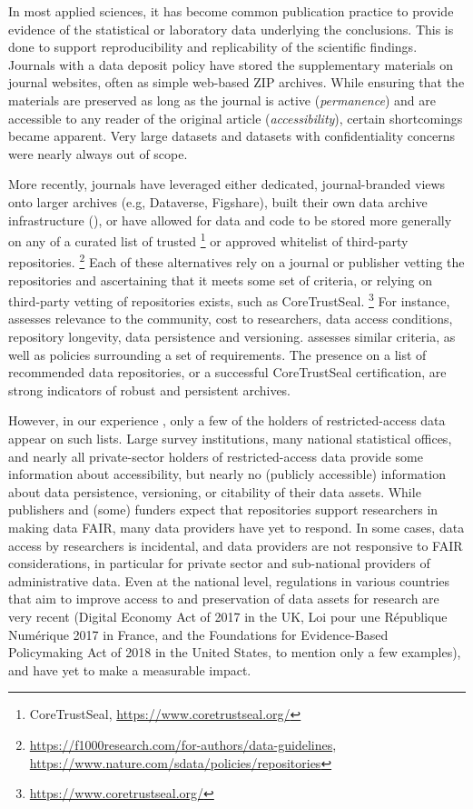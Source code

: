 In most applied sciences,
it has become common publication practice to provide evidence of the
statistical or laboratory data underlying the conclusions. This is done
to support reproducibility and replicability of the scientific
findings. 
Journals with a
data deposit policy have stored the supplementary materials on journal
websites, often as simple web-based ZIP archives. While ensuring that
the materials are preserved as long as the journal is active
(\textit{permanence}) and are accessible to any reader of the original article (\textit{accessibility}), certain shortcomings became
apparent. Very large datasets and datasets with confidentiality concerns
were nearly always out of scope. 

More recently, journals have leveraged
either dedicated, journal-branded views onto larger archives (e.g,
Dataverse, Figshare), built their own data archive infrastructure
(), or have allowed for data and code to be stored
more generally on any of a curated list of trusted%
\footnote{CoreTrustSeal, \url{https://www.coretrustseal.org/}}
or approved
whitelist of third-party repositories.%
\footnote{\url{https://f1000research.com/for-authors/data-guidelines}, \url{https://www.nature.com/sdata/policies/repositories}}
Each of these alternatives rely
on a journal or publisher vetting the repositories and ascertaining
that it meets some set of criteria, or relying on third-party vetting of
repositories exists, such as CoreTrustSeal.%
\footnote{\url{https://www.coretrustseal.org/}} 
For instance, \cite{NatureScientificData2019} assesses relevance to the community, cost to researchers, data access conditions, repository longevity, data persistence and versioning. \cite{CoreTrustSealCoreTrustSeal2017} assesses similar criteria, as well as policies surrounding a set of requirements. The presence on a list of recommended data repositories, or a successful CoreTrustSeal certification, are strong indicators of robust and persistent archives.

However, in our experience \parencite{VilhuberAEAPap.Proc.2020,Kingi2018}, only a few of the holders of restricted-access data appear on such lists. Large survey institutions, many national statistical offices, and nearly all private-sector holders of restricted-access data provide some information about accessibility, but nearly no (publicly accessible) information about data persistence, versioning, or citability of their data assets. While publishers and (some) funders expect that repositories support researchers in making data FAIR, many data providers have yet to respond. In some cases, data access by researchers is incidental, and data providers are not responsive to FAIR considerations, in particular for private sector and sub-national providers of administrative data. Even at the national level,   regulations in various countries that aim to improve access to and preservation of data assets for research are very recent (Digital Economy Act of 2017 in the UK, Loi pour une République Numérique 2017 in France, and the Foundations for Evidence-Based Policymaking Act of 2018 in the United States, to mention only a few examples), and have yet to make a measurable impact. 


